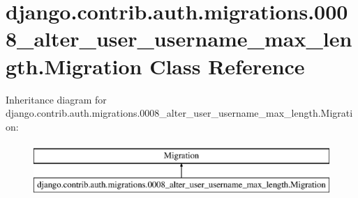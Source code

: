 \hypertarget{classdjango_1_1contrib_1_1auth_1_1migrations_1_10008__alter__user__username__max__length_1_1_migration}{}\section{django.\+contrib.\+auth.\+migrations.0008\+\_\+alter\+\_\+user\+\_\+username\+\_\+max\+\_\+length.Migration Class Reference}
\label{classdjango_1_1contrib_1_1auth_1_1migrations_1_10008__alter__user__username__max__length_1_1_migration}
Inheritance diagram for django.\+contrib.\+auth.\+migrations.0008\+\_\+alter\+\_\+user\+\_\+username\+\_\+max\+\_\+length.Migration\+:\begin{figure}[H]
\begin{center}
\leavevmode
\includegraphics[height=2.000000cm]{classdjango_1_1contrib_1_1auth_1_1migrations_1_10008__alter__user__username__max__length_1_1_migration}
\end{center}
\end{figure}
